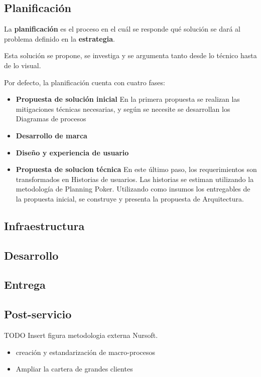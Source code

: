 \subsection{Planificación}

La \textbf{planificación} es el proceso en el cuál se responde qué solución se dará al problema definido en la \textbf{estrategia}.

Esta solución se propone, se investiga y se argumenta tanto desde lo técnico hasta de lo visual.

Por defecto, la planificación cuenta con cuatro fases:
\begin{itemize}
    \item \textbf{Propuesta de solución inicial}
    En la primera propuesta se realizan las mitigaciones técnicas necesarias, y según se necesite se 
    desarrollan los Diagramas de procesos
    \item \textbf{Desarrollo de marca}
    \item \textbf{Diseño y experiencia de usuario}
    \item \textbf{Propuesta de solucion técnica}
    En este último paso, los requerimientos son transformados en Historias de usuarios. Las historias se estiman utilizando la metodología de Planning Poker.
    Utilizando como insumos los entregables de la propuesta inicial, se construye y presenta la propuesta de Arquitectura.
\end{itemize}
\subsection{Infraestructura}
\subsection{Desarrollo}
\subsection{Entrega}
\subsection{Post-servicio}


TODO Insert figura metodologia externa Nursoft.

\begin{itemize}
  \item creación y estandarización de macro-procesos
  \item Ampliar la cartera de grandes clientes 
\end{itemize}


